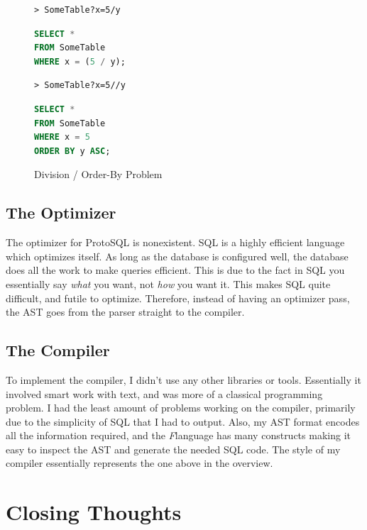 \documentclass[titlepage]{article}
\newcommand{\FS}{\textit{F\nolinebreak\hspace{-.05em}\raisebox{.5ex}{\small\bf \#}}} %
\begin{document}
			\begin{figure}
				\caption{Division / Order-By Problem}
				\begin{lstlisting}[language=ProtoSQL]
> SomeTable?x=5/y
				\end{lstlisting}

				\begin{lstlisting}[language=SQL]
SELECT *
FROM SomeTable
WHERE x = (5 / y);
				\end{lstlisting}

				\begin{lstlisting}[language=ProtoSQL]
> SomeTable?x=5//y
				\end{lstlisting}

				\begin{lstlisting}[language=SQL]
SELECT *
FROM SomeTable
WHERE x = 5
ORDER BY y ASC;
				\end{lstlisting}
			\end{figure}

		\subsection{The Optimizer}

			The optimizer for ProtoSQL is nonexistent.  SQL is a highly efficient language which optimizes itself.  As long as the database is configured well, the database does all the work to make queries efficient.  This is due to the fact in SQL you essentially say \textit{what} you want, not \textit{how} you want it.  This makes SQL quite difficult, and futile to optimize.  Therefore, instead of having an optimizer pass, the AST goes from the parser straight to the compiler.

		\subsection{The Compiler}

			To implement the compiler, I didn't use any other libraries or tools.  Essentially it involved smart work with text, and was more of a classical programming problem.  I had the least amount of problems working on the compiler, primarily due to the simplicity of SQL that I had to output.  Also, my AST format encodes all the information required, and the \FS language has many constructs making it easy to inspect the AST and generate the needed SQL code.  The style of my compiler essentially represents the one above in the overview.

	\section{Closing Thoughts}
\end{document}
